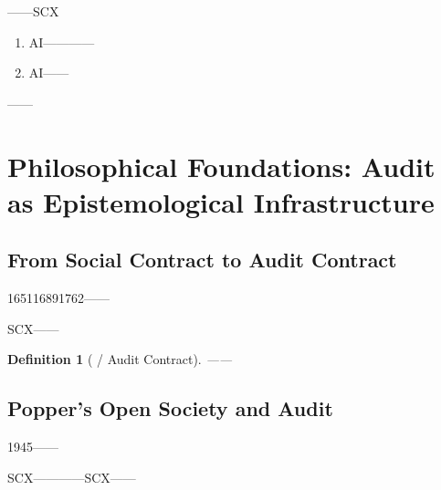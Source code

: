 \documentclass[12pt,a4paper]{article}
\newtheorem{definition}[theorem]{Definition}
\theoremstyle{remark}
\begin{document}
\textbf{}——SCX

\begin{enumerate}[label=(\arabic*)]
    \item \textbf{}AI————
    \item \textbf{}AI——
\end{enumerate}

——\textbf{}


\section{}
\section{Philosophical Foundations: Audit as Epistemological Infrastructure}

\subsection{}
\subsection{From Social Contract to Audit Contract}

165116891762\textbf{}\textbf{}——

SCX——\textbf{}

\begin{definition}[ / Audit Contract]
    ——
\end{definition}

\textbf{}\textbf{}

\subsection{}
\subsection{Popper's Open Society and Audit}

1945\textbf{}\textbf{}——

SCX\textbf{}————SCX——

\subsection{}
\end{document}
